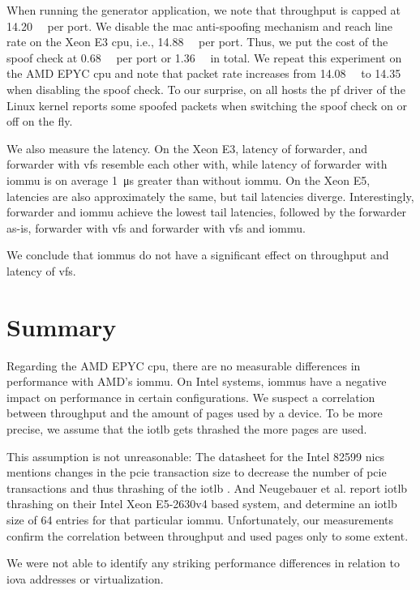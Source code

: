 When running the generator application, we note that throughput is capped at
\SI{14.20}{\mega\pps} per port. We disable the \ac{mac} anti-spoofing mechanism
and reach line rate on the Xeon E3 \ac{cpu}, i.e., \SI{14.88}{\mega\pps} per
port. Thus, we put the cost of the spoof check at \SI{0.68}{\mega\pps} per port
or \SI{1.36}{\mega\pps} in total. We repeat this experiment on the AMD EPYC
\ac{cpu} and note that packet rate increases from \SI{14.08}{\mega\pps} to
\SI{14.35}{\mega\pps} when disabling the spoof check. To our surprise, on all
hosts the \ac{pf} driver of the Linux kernel reports some spoofed packets when
switching the spoof check on or off on the fly.

We also measure the latency. On the Xeon E3, latency of forwarder, and forwarder
with \acp{vf} resemble each other with, while latency of forwarder with
\ac{iommu} is on average \SI{1}{\micro\second} greater than without \ac{iommu}.
On the Xeon E5, latencies are also approximately the same, but tail latencies
diverge. Interestingly, forwarder and \ac{iommu} achieve the lowest tail
latencies, followed by the forwarder as-is, forwarder with \acp{vf} and
forwarder with \acp{vf} and \ac{iommu}.

We conclude that \acp{iommu} do not have a significant effect on throughput and
latency of \acp{vf}.


\section{Summary}
\label{sec:perf_summary}

Regarding the AMD EPYC \ac{cpu}, there are no measurable differences in
performance with AMD's \ac{iommu}. On Intel systems, \acp{iommu} have a negative
impact on performance in certain configurations. We suspect a correlation
between throughput and the amount of pages used by a device. To be more precise,
we assume that the \ac{iotlb} gets thrashed the more pages are used.

This assumption is not unreasonable: The datasheet for the Intel 82599 \acp{nic}
mentions changes in the \ac{pcie} transaction size to decrease the number of
\ac{pcie} transactions and thus thrashing of the \ac{iotlb}
\cite[p.~34]{intel2019datasheet}. And Neugebauer et al.
\cite{neugebauer2018understanding} report \ac{iotlb} thrashing on their Intel
Xeon E5-2630v4 based system, and determine an \ac{iotlb} size of 64 entries for
that particular \ac{iommu}. Unfortunately, our measurements confirm the
correlation between throughput and used pages only to some extent.

We were not able to identify any striking performance differences in relation to
\ac{iova} addresses or virtualization.

